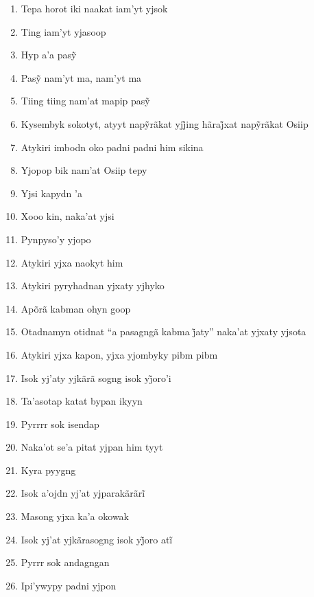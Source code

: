 \begin{enumerate}
 \item Tepa horot iki naakat iam'yt yjsok
 \item Ting iam'yt yjasoop
 \item Hyp a’a pasỹ
 \item Pasỹ nam’yt ma, nam’yt ma
 \item Tiing tiing nam’at mapip pasỹ
 
 \begin{center}\end{center}
 
 \item Kysembyk sokotyt, atyyt napỹrãkat yjj̃ing hãraj̃xat napỹrãkat Osiip
 \item Atykiri imbodn oko padni padni him sikina
 \item Yjopop bik nam'at Osiip tepy
 \item Yjsi kapydn 'a
 \item Xooo kin, naka'at yjsi
 \item Pynpyso'y yjopo
 \item Atykiri yjxa naokyt him
 
 \begin{center}\end{center}
 
 \item Atykiri pyryhadnan yjxaty yjhyko
 \item Apõrã kabman ohyn goop
 \item Otadnamyn otidnat ``a pasagngã kabma j̃aty'' naka’at yjxaty yjsota
 \item Atykiri yjxa kapon, yjxa yjombyky pibm pibm
 \item Isok yj’aty yjkãrã sogng isok yj̃oro’i
 
 \begin{center}\end{center}
 
 \item Ta'asotap katat bypan ikyyn
 \item Pyrrrr sok isendap
 \item Naka'ot se'a pitat yjpan him tyyt
 \item Kyra pyygng
 \item Isok a’ojdn yj’at yjparakãrãrĩ
 
 \begin{center}\end{center}
 
 \item Masong yjxa ka'a okowak
 \item Isok yj’at yjkãrasogng isok yj̃oro atĩ
 \item Pyrrr sok andagngan
 \item Ipi'ywypy padni yjpon
 

\end{enumerate}
